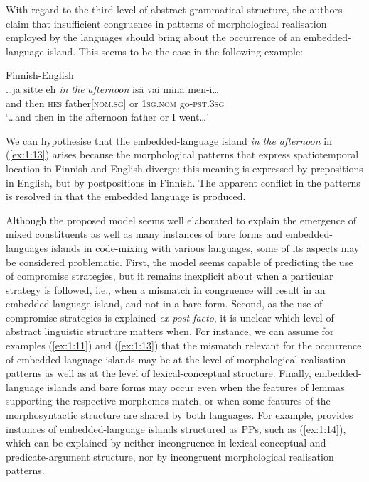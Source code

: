 With regard to the third level of abstract grammatical structure, the authors claim that insufficient congruence in patterns of morphological realisation employed by the languages should bring about the occurrence of an embedded-language island. This seems to be the case in the following example:

\ea{\label{ex:1:13}}
Finnish-English \citep[226]{lehtinen-analysis-1966}\\
\gll \dots ja sitte eh \textit{in the afternoon} isä vai minä men-i{\dots}\\
	\phantom{\dots}and then \textsc{hes} {} father[\textsc{nom.sg}] or \textsc{1sg.nom} go-\textsc{pst.3sg}\\
\glt `\dots and then in the afternoon father or I went{\dots}'
\z

\noindent We can hypothesise that the embedded-language island \textit{in the afternoon} in (\ref{ex:1:13}) arises because the morphological patterns that express spatiotemporal location in Finnish and English diverge: this meaning is expressed by prepositions in English, but by postpositions in Finnish. The apparent conflict in the patterns is resolved in that the embedded language is produced.

Although the proposed model seems well elaborated to explain the emergence of mixed constituents as well as many instances of bare forms and embedded-languages islands in code-mixing with various languages, some of its aspects may be considered problematic. First, the model seems capable of predicting the use of compromise strategies, but it remains inexplicit about when a particular strategy is followed, i.e., when a mismatch in congruence will result in an embedded-language island, and not in a bare form. Second, as the use of compromise strategies is explained \textit{ex post facto}, it is unclear which level of abstract linguistic structure matters when. For instance, we can assume for examples (\ref{ex:1:11}) and (\ref{ex:1:13}) that the mismatch relevant for the occurrence of embedded-language islands may be at the level of morphological realisation patterns as well as at the level of lexical-conceptual structure. Finally, embedded-language islands and bare forms may occur even when the features of lemmas supporting the respective morphemes match, or when some features of the morphosyntactic structure are shared by both languages. For example, \citet{treffers-daller-mixing-1994} provides instances of embedded-language islands structured as PPs, such as (\ref{ex:1:14}), which can be explained by neither incongruence in lexical-conceptual and predicate-argument structure, nor by incongruent morphological realisation patterns.

